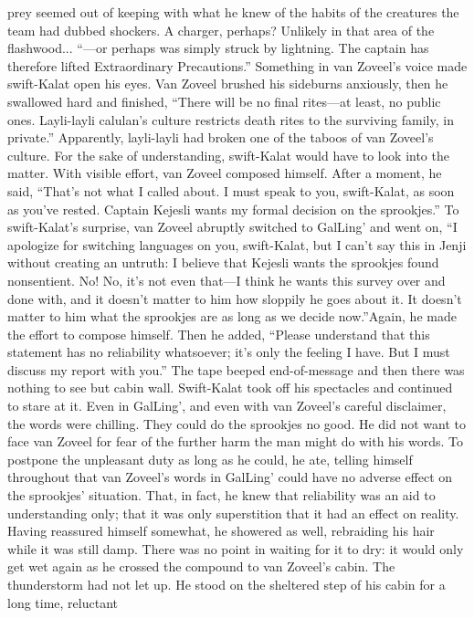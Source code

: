 \documentclass[9pt]{article}
\begin{document}
prey seemed out of keeping with what he knew of the habits of the creatures the team had dubbed
shockers. A charger, perhaps? Unlikely in that area of the flashwood...
“—or perhaps was simply struck by lightning. The captain has therefore lifted Extraordinary
Precautions.”
Something in van Zoveel’s voice made swift-Kalat open his eyes. Van Zoveel brushed his sideburns
anxiously, then he swallowed hard and finished, “There will be no final rites—at least, no public ones.
Layli-layli calulan’s culture restricts death rites to the surviving family, in private.”
Apparently, layli-layli had broken one of the taboos of van Zoveel’s culture. For the sake of
understanding, swift-Kalat would have to look into the matter.
With visible effort, van Zoveel composed himself. After a moment, he said, “That’s not what I called
about. I must speak to you, swift-Kalat, as soon as you’ve rested. Captain Kejesli wants my formal
decision on the sprookjes.”
To swift-Kalat’s surprise, van Zoveel abruptly switched to GalLing’ and went on, “I apologize for
switching languages on you, swift-Kalat, but I can’t say this in Jenji without creating an untruth: I believe
that Kejesli wants the sprookjes found nonsentient. No! No, it’s not even that—I think he wants this
survey over and done with, and it doesn’t matter to him how sloppily he goes about it. It doesn’t matter
to him what the sprookjes are as long as we decide now.”Again, he made the effort to compose himself. Then he added, “Please understand that this statement
has no reliability whatsoever; it’s only the feeling I have. But I must discuss my report with you.”
The tape beeped end-of-message and then there was nothing to see but cabin wall. Swift-Kalat took
off his spectacles and continued to stare at it. Even in GalLing’, and even with van Zoveel’s careful
disclaimer, the words were chilling. They could do the sprookjes no good. He did not want to face van
Zoveel for fear of the further harm the man might do with his words.
To postpone the unpleasant duty as long as he could, he ate, telling himself throughout that van
Zoveel’s words in GalLing’ could have no adverse effect on the sprookjes’ situation. That, in fact, he
knew that reliability was an aid to understanding only; that it was only superstition that it had an effect on
reality. Having reassured himself somewhat, he showered as well, rebraiding his hair while it was still
damp. There was no point in waiting for it to dry: it would only get wet again as he crossed the
compound to van Zoveel’s cabin.
The thunderstorm had not let up. He stood on the sheltered step of his cabin for a long time, reluctant
\end{document}
